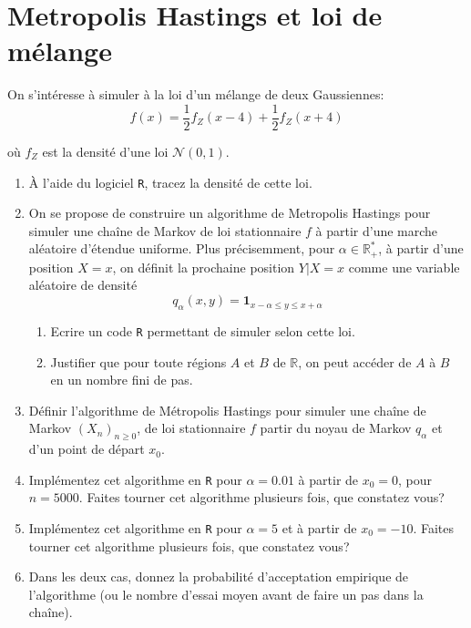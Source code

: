 \documentclass[]{article}
\providecommand{\tightlist}{%
  \setlength{\itemsep}{0pt}\setlength{\parskip}{0pt}}
\begin{document}
\hypertarget{metropolis-hastings-et-loi-de-muxe9lange}{%
\section{Metropolis Hastings et loi de
mélange}\label{metropolis-hastings-et-loi-de-muxe9lange}}

On s'intéresse à simuler à la loi d'un mélange de deux Gaussiennes:
\[f(x) = \frac{1}{2} f_Z(x - 4) + \frac{1}{2}f_Z(x + 4)\]

où \(f_Z\) est la densité d'une loi \(\mathcal{N}(0, 1)\).

\begin{enumerate}
\def\labelenumi{\arabic{enumi}.}
\item
  À l'aide du logiciel \texttt{R}, tracez la densité de cette loi.
\item
  On se propose de construire un algorithme de Metropolis Hastings pour
  simuler une chaîne de Markov de loi stationnaire \(f\) à partir d'une
  marche aléatoire d'étendue uniforme. Plus précisemment, pour
  \(\alpha \in \mathbb{R}^*_+\), à partir d'une position \(X = x\), on
  définit la prochaine position \(Y\vert X = x\) comme une variable
  aléatoire de densité
  \[q_\alpha(x, y) = \mathbf{1}_{x - \alpha \leq y \leq x + \alpha}\]

  \begin{enumerate}
  \def\labelenumii{\alph{enumii}.}
  \tightlist
  \item
    Ecrire un code \texttt{R} permettant de simuler selon cette loi.
  \item
    Justifier que pour toute régions \(A\) et \(B\) de \(\mathbb{R}\),
    on peut accéder de \(A\) à \(B\) en un nombre fini de pas.
  \end{enumerate}
\item
  Définir l'algorithme de Métropolis Hastings pour simuler une chaîne de
  Markov \((X_n)_{n\geq 0}\), de loi stationnaire \(f\) partir du noyau
  de Markov \(q_\alpha\) et d'un point de départ \(x_0\).
\item
  Implémentez cet algorithme en \texttt{R} pour \(\alpha = 0.01\) à
  partir de \(x_0 = 0\), pour \(n = 5000\). Faites tourner cet
  algorithme plusieurs fois, que constatez vous?
\item
  Implémentez cet algorithme en \texttt{R} pour \(\alpha = 5\) et à
  partir de \(x_0 = -10\). Faites tourner cet algorithme plusieurs fois,
  que constatez vous?
\item
  Dans les deux cas, donnez la probabilité d'acceptation empirique de
  l'algorithme (ou le nombre d'essai moyen avant de faire un pas dans la
  chaîne).
\end{enumerate}
\end{document}
